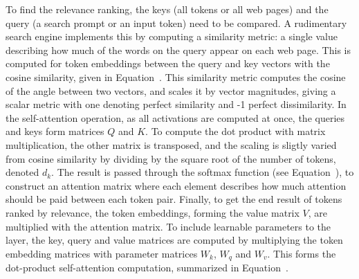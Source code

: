 \documentclass[english,twoside,openright]{UH_DS_MSc}
\begin{document}
To find the relevance ranking, the keys (all tokens or all web pages) and the query (a search prompt or an input token)
need to be compared. A rudimentary search engine implements this by computing a similarity metric:
a single value describing how much of the words on the query appear on each web page. This is computed for token embeddings
between the query and key vectors with the cosine similarity, given in Equation~\cite{eq:cos-similarity}. This similarity metric computes the 
cosine of the angle between two vectors, and scales it by vector magnitudes,
 giving a scalar metric with one denoting perfect similarity and -1 perfect dissimilarity.
 In the self-attention operation, as all activations are computed at once, the queries and keys form matrices $Q$ and $K$. 
 To compute the dot product with matrix multiplication, the other matrix is transposed, and the scaling is 
 sligtly varied from cosine similarity by dividing by the square root of the number of tokens, denoted $d_k$. The 
 result is passed through the softmax function (see Equation~\cite{eq:softmax}), to construct an attention matrix where 
 each element describes how much attention should be paid between each token pair. Finally, to get the end result of 
 tokens ranked by relevance, the token embeddings, forming the value matrix $V$, are multiplied with the attention matrix. To include learnable parameters to the layer, 
 the key, query and value matrices are computed by multiplying 
 the token embedding matrices with parameter matrices $W_k$, $W_ q$ and $W_v$. This forms the dot-product self-attention computation, summarized in Equation~\cite{eq:self-attention}.
 
\end{document}

